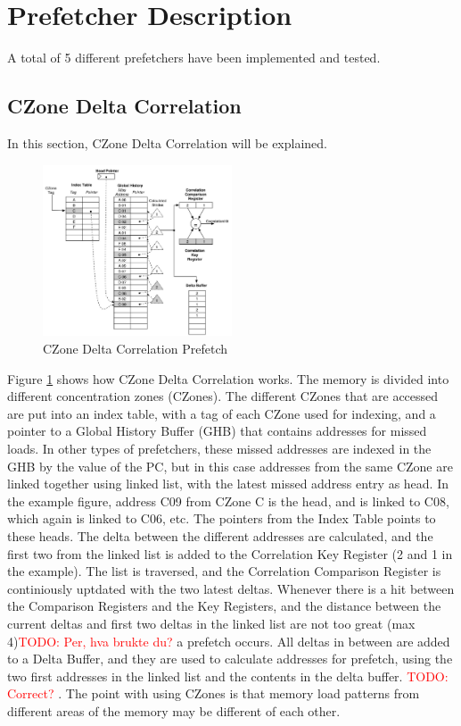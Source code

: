 \documentclass[a4paper]{IEEEtran}
\newcommand\TODO[1]{\textcolor{red}{TODO:#1}}
\newcommand\todo[1]{\TODO{#1}}
\begin{document}
\section{Prefetcher Description}
A total of 5 different prefetchers have been implemented and tested. 

\subsection{CZone Delta Correlation}
In this section, CZone Delta Correlation will be explained.

\begin{figure}[h!]
  \centering
      \includegraphics[width=0.5\textwidth]{Figures/CDC}
  \caption{CZone Delta Correlation Prefetch}
  \label{fig:CDC}
\end{figure}

Figure \ref{fig:CDC} shows how CZone Delta Correlation works. 
The memory is divided into different concentration zones (CZones). 
The different CZones that are accessed are put into an index table, with a tag of each CZone used for indexing, and a pointer to a Global History Buffer (GHB) that contains addresses for missed loads. 
In other types of prefetchers, these missed addresses are indexed in the GHB by the value of the PC, but in this case addresses from the same CZone are linked together using linked list, with the latest missed address entry as head. 
In the example figure, address C09 from CZone C is the head, and is linked to C08,  which again is linked to C06, etc. 
The pointers from the Index Table points to these heads.
The delta between the different addresses are calculated, and the first two from the linked list is added to the Correlation Key Register (2 and 1 in the example). 
The list is traversed, and the Correlation Comparison Register is continiously uptdated with the two latest deltas. 
Whenever there is a hit between the Comparison Registers and the Key Registers, and the distance between the current deltas and first two deltas in the linked list are not too great (max 4)\todo{ Per, hva brukte du?} a prefetch occurs. 
All deltas in between are added to a Delta Buffer, and they are used to calculate addresses for prefetch, using the two first addresses in the linked list and the contents in the delta buffer. \todo{ Correct? }. 
The point with using CZones is that memory load patterns from different areas of the memory may be different of each other. 
\end{document}
